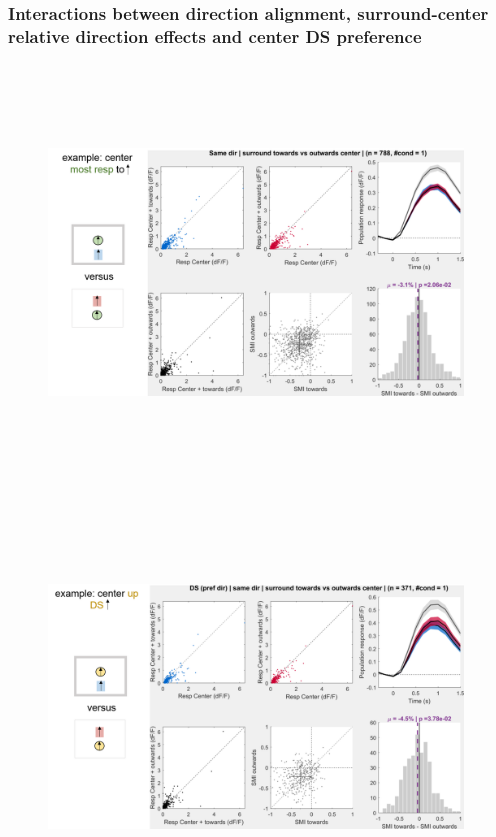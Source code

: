 \subsubsection{Interactions between direction alignment, surround-center relative direction effects and center DS preference}

\begin{figure}[H] \centering \includegraphics[width=11cm,height=11cm,keepaspectratio]{Figures/7.Results/population/sel/diagrams/19.png} 
\end{figure}

\begin{figure}[H] \centering \includegraphics[width=11cm,height=11cm,keepaspectratio]{Figures/7.Results/population/sel/diagrams/20.png} 
\end{figure}


